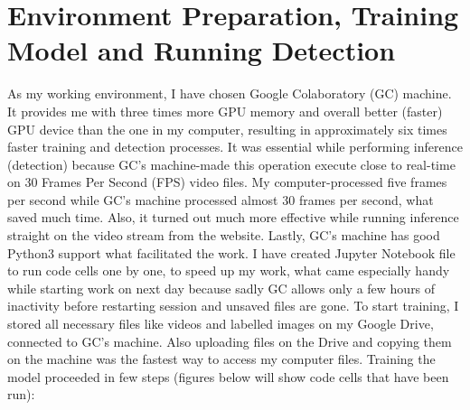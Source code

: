 \section{Environment Preparation, Training Model and Running Detection}
\label{sec:env}
As my working environment, I have chosen Google Colaboratory (GC) machine. It provides me with three times more GPU memory and overall better (faster) GPU device than the one in my computer, resulting in approximately six times faster training and detection processes. It was essential while performing inference (detection) because GC's machine-made this operation execute close to real-time on 30 Frames Per Second (FPS) video files. My computer-processed five frames per second while GC's machine processed almost 30 frames per second, what saved much time. Also, it turned out much more effective while running inference straight on the video stream from the website. Lastly, GC's machine has good Python3 support what facilitated the work. I have created Jupyter Notebook file to run code cells one by one, to speed up my work, what came especially handy while starting work on next day because sadly GC allows only a few hours of inactivity before restarting session and unsaved files are gone. To start training, I stored all necessary files like videos and labelled images on my Google Drive, connected to GC's machine. Also uploading files on the Drive and copying them on the machine was the fastest way to access my computer files. Training the model proceeded in few steps (figures below will show code cells that have been run):
